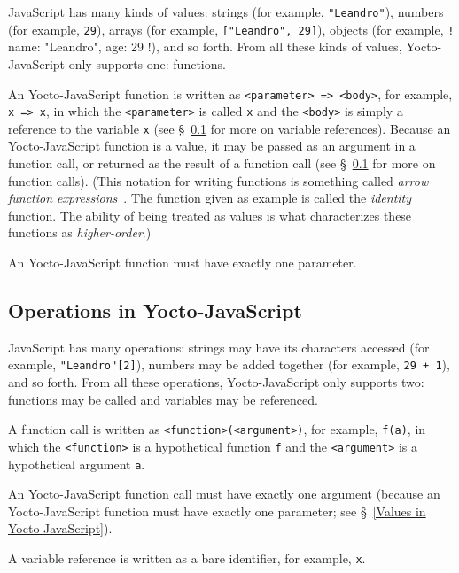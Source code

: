 \documentclass[12pt, oneside]{book}
\begin{document}
JavaScript has many kinds of values: strings (for example, \texttt{"Leandro"}), numbers (for example, \texttt{29}), arrays (for example, \texttt{["Leandro", 29]}), objects (for example, \texttt!{ name: "Leandro", age: 29 }!), and so forth. From all these kinds of values, Yocto-JavaScript only supports one: functions.

An Yocto-JavaScript function is written as \verb!<parameter> => <body>!, for example, \texttt{x => x}, in which the \verb!<parameter>! is called \texttt{x} and the \verb!<body>! is simply a reference to the variable \texttt{x} (see §~\ref{Operations in Yocto-JavaScript} for more on variable references). Because an Yocto-JavaScript function is a value, it may be passed as an argument in a function call, or returned as the result of a function call (see §~\ref{Operations in Yocto-JavaScript} for more on function calls). (This notation for writing functions is something called \emph{arrow function expressions}~\cite{arrow-function-expressions}. The function given as example is called the \emph{identity} function. The ability of being treated as values is what characterizes these functions as \emph{higher-order}.)

An Yocto-JavaScript function must have exactly one parameter.

\subsection{Operations in Yocto-JavaScript}
\label{Operations in Yocto-JavaScript}

JavaScript has many operations: strings may have its characters accessed (for example, \texttt{"Leandro"[2]}), numbers may be added together (for example, \texttt{29 + 1}), and so forth. From all these operations, Yocto-JavaScript only supports two: functions may be called and variables may be referenced.

A function call is written as \verb!<function>(<argument>)!, for example, \texttt{f(a)}, in which the \verb!<function>! is a hypothetical function \texttt{f} and the \verb!<argument>! is a hypothetical argument \texttt{a}.

An Yocto-JavaScript function call must have exactly one argument (because an Yocto-JavaScript function must have exactly one parameter; see §~\ref{Values in Yocto-JavaScript}).

A variable reference is written as a bare identifier, for example, \texttt{x}.
\end{document}
